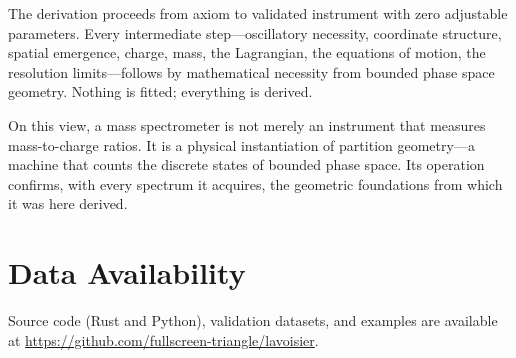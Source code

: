 \documentclass[twocolumn,10pt,a4paper]{article}
\theoremstyle{definition}
\theoremstyle{remark}
\begin{document}
The derivation proceeds from axiom to validated instrument with zero adjustable parameters. Every intermediate step---oscillatory necessity, coordinate structure, spatial emergence, charge, mass, the Lagrangian, the equations of motion, the resolution limits---follows by mathematical necessity from bounded phase space geometry. Nothing is fitted; everything is derived.

On this view, a mass spectrometer is not merely an instrument that measures mass-to-charge ratios. It is a physical instantiation of partition geometry---a machine that counts the discrete states of bounded phase space. Its operation confirms, with every spectrum it acquires, the geometric foundations from which it was here derived.



\section*{Data Availability}

Source code (Rust and Python), validation datasets, and examples are available at \url{https://github.com/fullscreen-triangle/lavoisier}.



\end{document}
